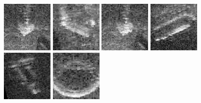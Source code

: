 \begin{figure}
{{			\includegraphics[width=0.11 \textwidth]{chapters/images/matching/non-match139410-A.jpg}
			\includegraphics[width=0.11 \textwidth]{chapters/images/matching/non-match139410-B.jpg} \;
			\includegraphics[width=0.11 \textwidth]{chapters/images/matching/non-match141822-A.jpg}
			\includegraphics[width=0.11 \textwidth]{chapters/images/matching/non-match141822-B.jpg} \;
			\includegraphics[width=0.11 \textwidth]{chapters/images/matching/non-match44796-A.jpg}
			\includegraphics[width=0.11 \textwidth]{chapters/images/matching/non-match44796-B.jpg}
		}
	}


\end{figure}
